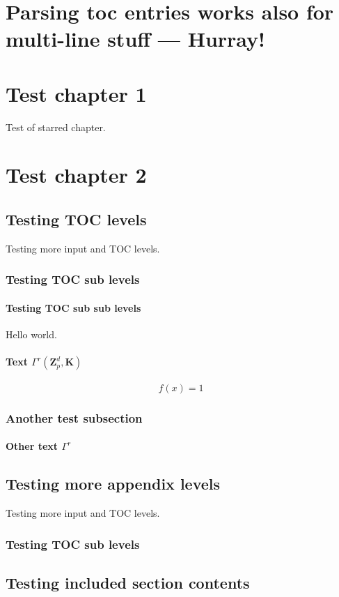 \chapter[Parsing toc specific entries works 
  also for multi-line --- A second Hurray!]{Parsing {toc entries works
  also for} multi-line \texorpdfstring{stuff}{entries}
--- Hurray!}

\chapter*{Test chapter 1}
Test of starred chapter.

\chapter{Test chapter 2}
\label{chap:second test}

\section{Testing TOC levels}
Testing more input and TOC levels.

\subsection{Testing TOC sub levels}

\subsubsection{Testing TOC sub sub levels}
Hello world.

\subsubsection{Text $\Gamma^{r}(\ensuremath{{\mathbf{Z}}}_p^d,\mathbf{K})$}

\begin{equation}
  \label{eq:test equation label}
  f(x) = 1
\end{equation}

\subsection{Another test subsection}

\subsubsection{Other text $\Gamma^{r}$}

\section{Testing more appendix levels}
Testing more input and TOC levels.

\subsection{Testing TOC sub levels}

\section{Testing included section contents}



